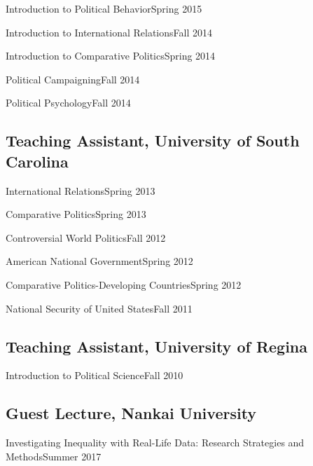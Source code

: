 \documentclass[10.5pt,]{article}
\providecommand{\tightlist}{%
	\setlength{\itemsep}{0pt}\setlength{\parskip}{0pt}}
\renewenvironment{itemize}{
	\begin{list}{}{
			\setlength{\leftmargin}{1.5em}
		}
	}{
	\end{list}
}
\begin{document}
\begin{itemize}
\tightlist
\item
  Introduction to Political Behavior\hfill Spring 2015
\item
  Introduction to International Relations\hfill Fall 2014
\item
  Introduction to Comparative Politics\hfill Spring 2014
\item
  Political Campaigning\hfill Fall 2014
\item
  Political Psychology\hfill Fall 2014
\end{itemize}

\subsection{Teaching Assistant, University of South
Carolina}\label{teaching-assistant-university-of-south-carolina}

\begin{itemize}
\tightlist
\item
  International Relations\hfill Spring 2013
\item
  Comparative Politics\hfill Spring 2013
\item
  Controversial World Politics\hfill Fall 2012
\item
  American National Government\hfill Spring 2012
\item
  Comparative Politics-Developing Countries\hfill Spring 2012
\item
  National Security of United States\hfill Fall 2011
\end{itemize}

\subsection{Teaching Assistant, University of
Regina}\label{teaching-assistant-university-of-regina}

\begin{itemize}
\tightlist
\item
  Introduction to Political Science\hfill Fall 2010
\end{itemize}

\subsection{Guest Lecture, Nankai
University}\label{guest-lecture-nankai-university}

\begin{itemize}
\tightlist
\item
  Investigating Inequality with Real-Life Data: Research Strategies and
  Methods\hfill Summer 2017
\end{itemize}
\end{document}
